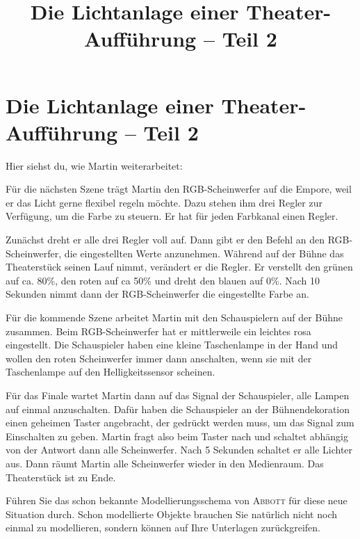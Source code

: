 \documentclass[11pt, a4paper,parskip=half]{scrartcl}
\title{Die Lichtanlage einer Theater-Aufführung -- Teil 2}
\begin{document}
\section*{Die Lichtanlage einer Theater-Aufführung -- Teil 2}

Hier siehst du, wie Martin weiterarbeitet:

\begin{mdframed}
Für die nächsten Szene trägt Martin den RGB-Scheinwerfer auf die Empore, weil er das Licht gerne flexibel regeln möchte. Dazu stehen ihm drei Regler zur Verfügung, um die Farbe zu steuern. Er hat für jeden Farbkanal einen Regler.

Zunächst dreht er alle drei Regler voll auf. Dann gibt er den Befehl an den RGB-Scheinwerfer, die eingestellten Werte anzunehmen. Während auf der Bühne das Theaterstück seinen Lauf nimmt, verändert er die Regler. Er verstellt den grünen auf ca. 80\%, den roten auf ca 50\% und dreht den blauen auf 0\%. Nach 10 Sekunden nimmt dann der RGB-Scheinwerfer die eingestellte Farbe an.



Für die kommende Szene arbeitet Martin mit den Schauspielern auf der Bühne zusammen. Beim RGB-Scheinwerfer hat er mittlerweile ein leichtes rosa eingestellt. Die Schauspieler haben eine kleine Taschenlampe in der Hand und wollen den roten Scheinwerfer immer dann anschalten, wenn sie mit der Taschenlampe auf den Helligkeitssensor scheinen.

Für das Finale wartet Martin dann auf das Signal der Schauspieler, alle Lampen auf einmal anzuschalten. Dafür haben die Schauspieler an der Bühnendekoration einen geheimen Taster angebracht, der gedrückt werden muss, um das Signal zum Einschalten zu geben. Martin fragt also beim Taster nach und schaltet abhängig von der Antwort dann alle Scheinwerfer. Nach 5 Sekunden schaltet er alle Lichter aus. Dann räumt Martin alle Scheinwerfer wieder in den Medienraum. Das Theaterstück ist zu Ende.
\end{mdframed}

\vfill

\begin{aufgabe}
Führen Sie das schon bekannte Modellierungsschema von \textsc{Abbott} für diese neue Situation durch. Schon modellierte Objekte brauchen Sie natürlich nicht noch einmal zu modellieren, sondern können auf Ihre Unterlagen zurückgreifen.
\end{aufgabe}
\end{document}
